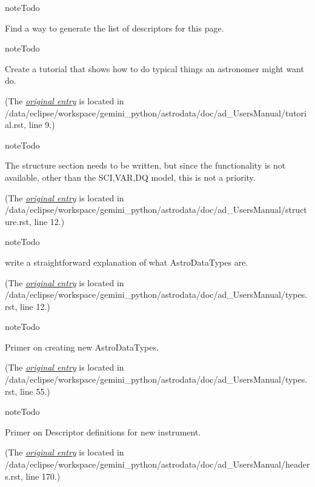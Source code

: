 \documentclass[letterpaper,10pt,english]{sphinxmanual}
\begin{document}
\begin{notice}{note}{Todo}

Find a way to generate the list of descriptors for this page.
\end{notice}

\begin{notice}{note}{Todo}

Create a tutorial that shows how to do typical things an astronomer might want do.
\end{notice}

(The {\hyperref[tutorial:index-0]{\emph{original entry}}} is located in  /data/eclipse/workspace/gemini\_python/astrodata/doc/ad\_UsersManual/tutorial.rst, line 9.)

\begin{notice}{note}{Todo}

The structure section needs to be written, but since the functionality
is not available, other than the SCI,VAR,DQ model, this is not a priority.
\end{notice}

(The {\hyperref[structure:index-0]{\emph{original entry}}} is located in  /data/eclipse/workspace/gemini\_python/astrodata/doc/ad\_UsersManual/structure.rst, line 12.)

\begin{notice}{note}{Todo}

write a straightforward explanation of what AstroDataTypes are.
\end{notice}

(The {\hyperref[types:index-0]{\emph{original entry}}} is located in  /data/eclipse/workspace/gemini\_python/astrodata/doc/ad\_UsersManual/types.rst, line 12.)

\begin{notice}{note}{Todo}

Primer on creating new AstroDataTypes.
\end{notice}

(The {\hyperref[types:index-1]{\emph{original entry}}} is located in  /data/eclipse/workspace/gemini\_python/astrodata/doc/ad\_UsersManual/types.rst, line 55.)

\begin{notice}{note}{Todo}

Primer on Descriptor definitions for new instrument.
\end{notice}

(The {\hyperref[headers:index-0]{\emph{original entry}}} is located in  /data/eclipse/workspace/gemini\_python/astrodata/doc/ad\_UsersManual/headers.rst, line 170.)
\end{document}
